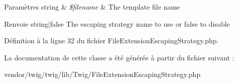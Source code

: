 \begin{DoxyParams}[1]{Paramètres}
string & {\em \$filename} & The template file name\\
\hline
\end{DoxyParams}
\begin{DoxyReturn}{Renvoie}
string$\vert$false The escaping strategy name to use or false to disable 
\end{DoxyReturn}


Définition à la ligne 32 du fichier File\+Extension\+Escaping\+Strategy.\+php.



La documentation de cette classe a été générée à partir du fichier suivant \+:\begin{DoxyCompactItemize}
\item 
vendor/twig/twig/lib/\+Twig/File\+Extension\+Escaping\+Strategy.\+php\end{DoxyCompactItemize}
